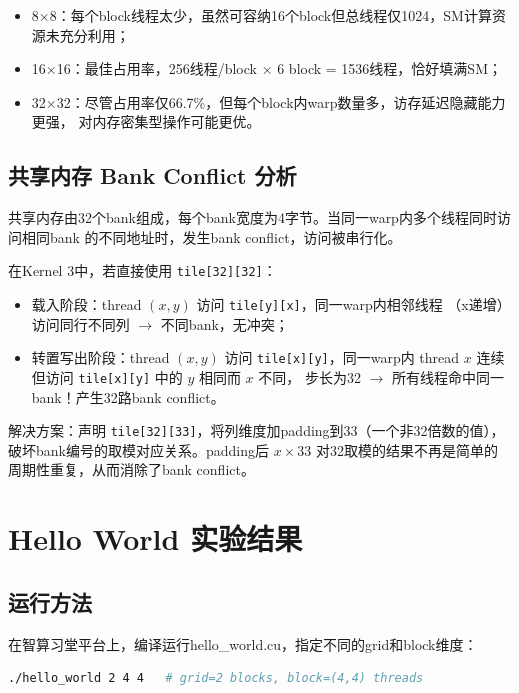 \documentclass[UTF8,a4paper,12pt,fontset=none]{ctexart}
\begin{document}
\begin{itemize}
  \item 8×8：每个block线程太少，虽然可容纳16个block但总线程仅1024，SM计算资源未充分利用；
  \item 16×16：最佳占用率，256线程/block × 6 block = 1536线程，恰好填满SM；
  \item 32×32：尽管占用率仅66.7\%，但每个block内warp数量多，访存延迟隐藏能力更强，
        对内存密集型操作可能更优。
\end{itemize}

\subsection{共享内存 Bank Conflict 分析}

共享内存由32个bank组成，每个bank宽度为4字节。当同一warp内多个线程同时访问相同bank
的不同地址时，发生bank conflict，访问被串行化。

在Kernel 3中，若直接使用 \texttt{tile[32][32]}：
\begin{itemize}
  \item 载入阶段：thread $(x, y)$ 访问 \texttt{tile[y][x]}，同一warp内相邻线程
        （x递增）访问同行不同列 $\to$ 不同bank，无冲突；
  \item 转置写出阶段：thread $(x, y)$ 访问 \texttt{tile[x][y]}，同一warp内
        thread $x$ 连续但访问 \texttt{tile[x][y]} 中的 $y$ 相同而 $x$ 不同，
        步长为32 $\to$ 所有线程命中同一bank！产生32路bank conflict。
\end{itemize}

解决方案：声明 \texttt{tile[32][33]}，将列维度加padding到33（一个非32倍数的值），
破坏bank编号的取模对应关系。padding后 $x \times 33$ 对32取模的结果不再是简单的
周期性重复，从而消除了bank conflict。

\section{Hello World 实验结果}

\subsection{运行方法}

在智算习堂平台上，编译运行hello\_world.cu，指定不同的grid和block维度：

\begin{lstlisting}[language=bash]
./hello_world 2 4 4   # grid=2 blocks, block=(4,4) threads
\end{lstlisting}
\end{document}
